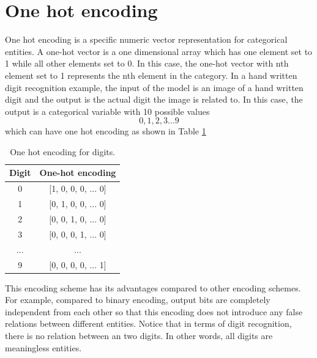 \documentclass[12pt]{WSUThesis}
\theoremstyle{definition}
\begin{document}
\section{One hot encoding}
One hot encoding is a specific numeric vector representation for categorical entities. A one-hot vector is a one dimensional array which has one element set to 1 while all other elements set to 0. In this case, the one-hot vector with nth element set to 1 represents the nth element in the category.
In a hand written digit recognition example, the input of the model is an image of a hand written digit and the output is the actual digit the image is related to.
In this case, the output is a categorical variable with 10 possible values
\[0, 1, 2, 3 ... 9\]
which can have one hot encoding as shown in Table \ref{tab:one-hot-encoding}
\begin{table}[ht]\centering
	\caption{One hot encoding for digits.}
	\begin{tabular}{cc} \hline \rowcolor{blue!30}
		Digit & One-hot encoding \\ \hline
		0 & [1, 0, 0, 0, ... 0]       \\ \hline
		1 & [0, 1, 0, 0, ... 0]       \\ \hline
		2 & [0, 0, 1, 0, ... 0]       \\ \hline
		3 & [0, 0, 0, 1, ... 0]       \\ \hline
		... & ...       \\ \hline
		9 & [0, 0, 0, 0, ... 1]       \\ \hline
	\end{tabular}
	\label{tab:one-hot-encoding}
\end{table}
This encoding scheme has its advantages compared to other encoding schemes. For example, compared to binary encoding, output bits are completely independent from each other so that this encoding does not introduce any false relations between different entities. Notice that in terms of digit recognition, there is no relation between an two digits. In other words, all digits are meaningless entities.
\end{document}
